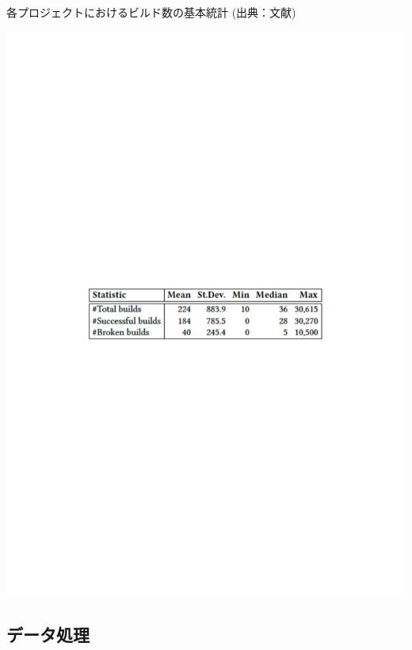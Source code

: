 \begin{table}[t]
    \centering
    \caption{各プロジェクトにおけるビルド数の基本統計 (出典：文献\cite{docker-failures})}
    \includegraphics[width=0.9\linewidth, angle=0]{./thesis3/docker-build-data3.pdf}
    \label{fig:3_docker-build-data}
\end{table}

\subsection{データ処理}

